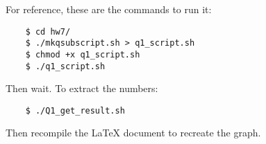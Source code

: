\documentclass[11pt]{article}
\begin{document}
For reference, these are the commands to run it:
\begin{center}
\begin{verbatim}
    $ cd hw7/
    $ ./mkqsubscript.sh > q1_script.sh
    $ chmod +x q1_script.sh
    $ ./q1_script.sh
\end{verbatim}
\end{center}
Then wait. To extract the numbers:
\begin{center}
\begin{verbatim}
    $ ./Q1_get_result.sh
\end{verbatim}
\end{center}
Then recompile the \LaTeX{} document  to recreate the graph.
\end{document}
